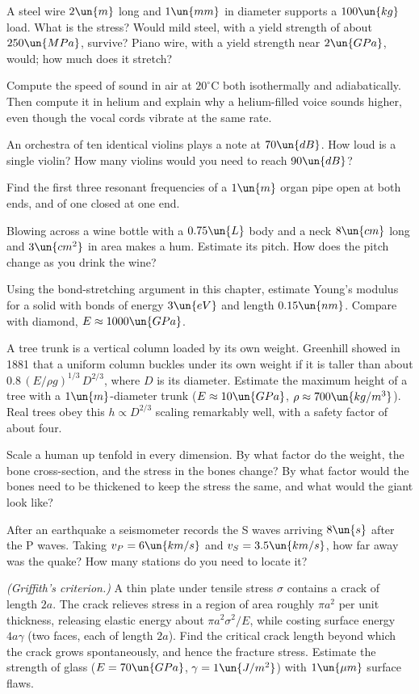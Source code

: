 \begin{problems}
\core A steel wire $2\un{m}$ long and $1\un{mm}$ in diameter supports a $100\un{kg}$ load. What is the stress? Would mild steel, with a yield strength of about $250\un{MPa}$, survive? Piano wire, with a yield strength near $2\un{GPa}$, would; how much does it stretch?

 Compute the speed of sound in air at $20^\circ\text{C}$ both isothermally and adiabatically. Then compute it in helium and explain why a helium-filled voice sounds higher, even though the vocal cords vibrate at the same rate.

 An orchestra of ten identical violins plays a note at $70\un{dB}$. How loud is a single violin? How many violins would you need to reach $90\un{dB}$?

 Find the first three resonant frequencies of a $1\un{m}$ organ pipe open at both ends, and of one closed at one end.

\core Blowing across a wine bottle with a $0.75\un{L}$ body and a neck $8\un{cm}$ long and $3\un{cm^2}$ in area makes a hum. Estimate its pitch. How does the pitch change as you drink the wine?

\core Using the bond-stretching argument in this chapter, estimate Young's modulus for a solid with bonds of energy $3\un{eV}$ and length $0.15\un{nm}$. Compare with diamond, $E\approx1000\un{GPa}$.

 A tree trunk is a vertical column loaded by its own weight. Greenhill showed in 1881 that a uniform column buckles under its own weight if it is taller than about $0.8\,(E/\rho g)^{1/3}\,D^{2/3}$, where $D$ is its diameter. Estimate the maximum height of a tree with a $1\un{m}$-diameter trunk ($E\approx10\un{GPa}$, $\rho\approx700\un{kg/m^3}$). Real trees obey this $h\propto D^{2/3}$ scaling remarkably well, with a safety factor of about four.

 Scale a human up tenfold in every dimension. By what factor do the weight, the bone cross-section, and the stress in the bones change? By what factor would the bones need to be thickened to keep the stress the same, and what would the giant look like?

 After an earthquake a seismometer records the S waves arriving $8\un{s}$ after the P waves. Taking $v_P = 6\un{km/s}$ and $v_S = 3.5\un{km/s}$, how far away was the quake? How many stations do you need to locate it?

\core \emph{(Griffith's criterion.)} A thin plate under tensile stress $\sigma$ contains a crack of length $2a$. The crack relieves stress in a region of area roughly $\pi a^2$ per unit thickness, releasing elastic energy about $\pi a^2\sigma^2/E$, while costing surface energy $4a\gamma$ (two faces, each of length $2a$). Find the critical crack length beyond which the crack grows spontaneously, and hence the fracture stress. Estimate the strength of glass ($E = 70\un{GPa}$, $\gamma = 1\un{J/m^2}$) with $1\un{\mu m}$ surface flaws.


\end{problems}
